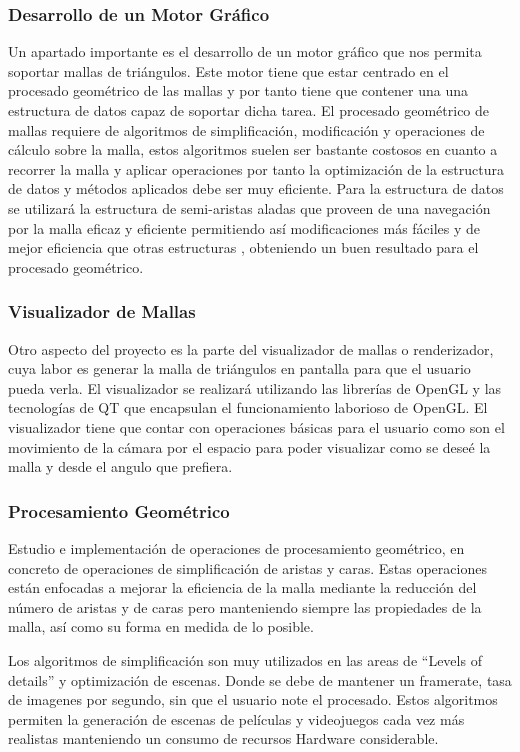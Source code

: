 \subsubsection{Desarrollo de un Motor Gráfico}
Un apartado importante es el desarrollo de un motor gráfico que nos permita soportar mallas de triángulos. Este motor tiene que estar centrado en el procesado geométrico de las mallas y por tanto tiene que contener una una estructura de datos capaz de soportar dicha tarea. El procesado geométrico de mallas requiere de algoritmos de simplificación, modificación y operaciones de cálculo sobre la malla, estos algoritmos suelen ser bastante costosos en cuanto a recorrer la malla y aplicar operaciones por tanto la optimización de la estructura de datos y métodos aplicados debe ser muy eficiente. Para la estructura de datos se utilizará la estructura de semi-aristas aladas que proveen de una navegación por la malla eficaz y eficiente permitiendo así modificaciones más fáciles y de mejor eficiencia que otras estructuras \cite{kettnerUsingGenericProgramming1999}, obteniendo un buen resultado para el procesado geométrico.

\subsubsection{Visualizador de Mallas}
Otro aspecto del proyecto es la parte del visualizador de mallas o renderizador, cuya labor es generar la malla de triángulos en pantalla para que el usuario pueda verla. El visualizador se realizará utilizando las librerías de OpenGL y las tecnologías de QT que encapsulan el funcionamiento laborioso de OpenGL. El visualizador tiene que contar con operaciones básicas para el usuario como son el movimiento de la cámara por el espacio para poder visualizar como se deseé la malla y desde el angulo que prefiera.

\subsubsection{Procesamiento Geométrico}
Estudio e implementación de operaciones de procesamiento geométrico, en concreto de operaciones de simplificación de aristas y caras. Estas operaciones están enfocadas a mejorar la eficiencia de la malla mediante la reducción del número de aristas y de caras pero manteniendo siempre las propiedades de la malla, así como su forma en medida de lo posible.

Los algoritmos de simplificación son muy utilizados en las areas de ``Levels of details'' y optimización de escenas. Donde se debe de mantener un framerate, tasa de imagenes por segundo, sin que el usuario note el procesado. Estos algoritmos permiten la generación de escenas de películas y videojuegos cada vez más realistas manteniendo un consumo de recursos Hardware considerable.

